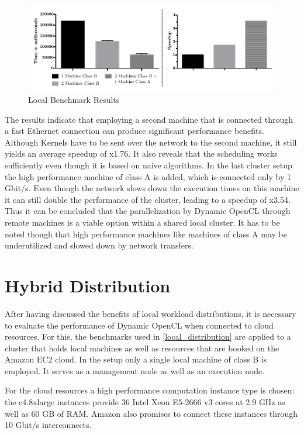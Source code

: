 \begin{figure}[H]
	
	\includegraphics[width=1.0\textwidth]{images/local_full_benchmark_results.pdf}
	\centering
	\caption{Local Benchmark Results}
	\label{img:local_benchmark_results}
\end{figure}

The results indicate that employing a second machine that is connected through a fast Ethernet connection can produce significant performance benefits. Although Kernels have to be sent over the network to the second machine, it still yields an average speedup of x1.76. It also reveals that the scheduling works sufficiently even though it is based on naive algorithms. In the last cluster setup the high performance machine of class A is added, which is connected only by 1 Gbit/s. Even though the network slows down the execution times on this machine it can still double the performance of the cluster, leading to a speedup of x3.54. Thus it can be concluded that the parallelization by Dynamic OpenCL through remote machines is a viable option within a shared local cluster. It has to be noted though that high performance machines like machines of class A may be underutilized and slowed down by network transfers.

\section{Hybrid Distribution}

After having discussed the benefits of local workload distributions, it is necessary to evaluate the performance of Dynamic OpenCL when connected to cloud resources. For this, the benchmarks used in \ref{local_distribution} are applied to a cluster that holds local machines as well as resources that are booked on the Amazon EC2 cloud. In the setup only a single local machine of class B is employed. It serves as a management node as well as an execution node. 

For the cloud resources a high performance computation instance type is chosen: the c4.8xlarge instances provide 36 Intel Xeon E5-2666 v3 cores at 2.9 GHz as well as 60 GB of RAM. Amazon also promises to connect these instances through 10 Gbit/s interconnects.


